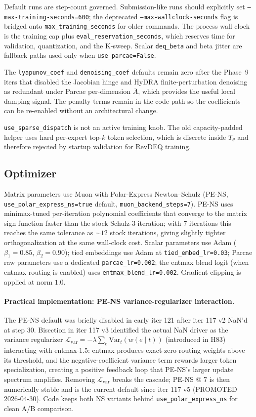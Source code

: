 \documentclass[11pt]{article}
\begin{document}
Default runs are step-count governed.  Submission-like runs should explicitly
set \texttt{--max-training-seconds=600}; the deprecated
\texttt{--max-wallclock-seconds} flag is bridged onto
\texttt{max\_training\_seconds} for older commands.  The process wall clock is
the training cap plus \texttt{eval\_reservation\_seconds}, which reserves time
for validation, quantization, and the K-sweep.  Scalar \texttt{deq\_beta} and
beta jitter are fallback paths used only when \texttt{use\_parcae=False}.

The \texttt{lyapunov\_coef} and \texttt{denoising\_coef} defaults remain zero
after the Phase~9 iters that disabled the Jacobian hinge and HyDRA
finite-perturbation denoising as redundant under Parcae per-dimension
$\bar A$, which provides the useful local damping signal.  The penalty terms
remain in the code path so the coefficients can be re-enabled without an
architectural change.

\texttt{use\_sparse\_dispatch} is not an active training knob.  The old
capacity-padded helper uses hard per-expert top-$k$ token selection, which is
discrete inside $T_\theta$ and therefore rejected by startup validation for
RevDEQ training.

\subsection{Optimizer}
\label{sec:optimizer}

Matrix parameters use Muon with Polar-Express Newton--Schulz (PE-NS,
\texttt{use\_polar\_express\_ns=true} default, \texttt{muon\_backend\_steps=7}).
PE-NS uses minimax-tuned per-iteration polynomial coefficients that converge to
the matrix sign function faster than the stock Schulz-3 iteration; with 7
iterations this reaches the same tolerance as $\sim 12$ stock iterations,
giving slightly tighter orthogonalization at the same wall-clock cost.  Scalar
parameters use Adam ($\beta_1{=}0.85$, $\beta_2{=}0.90$); tied embeddings use
Adam at \texttt{tied\_embed\_lr=0.03}; Parcae raw parameters use a dedicated
\texttt{parcae\_lr=0.002}; the entmax blend logit (when entmax routing is
enabled) uses \texttt{entmax\_blend\_lr=0.002}.  Gradient clipping is applied
at norm $1.0$.

\paragraph{Practical implementation: PE-NS variance-regularizer interaction.}
The PE-NS default was briefly disabled in early iter 121 after iter 117 v2
NaN'd at step 30.  Bisection in iter 117 v3 identified the actual NaN driver
as the variance regularizer
$\mathcal{L}_{\mathrm{var}} = -\lambda \sum_e \mathrm{Var}_t(w(e \mid t))$
(introduced in H83) interacting with entmax-1.5: entmax produces exact-zero
routing weights above its threshold, and the negative-coefficient variance
term rewards larger token specialization, creating a positive feedback loop
that PE-NS's larger update spectrum amplifies.  Removing $\mathcal{L}_{\mathrm{var}}$
breaks the cascade; PE-NS @ 7 is then numerically stable and is the current
default since iter 117 v5 (PROMOTED 2026-04-30).  Code keeps both NS variants
behind \texttt{use\_polar\_express\_ns} for clean A/B comparison.
\end{document}
